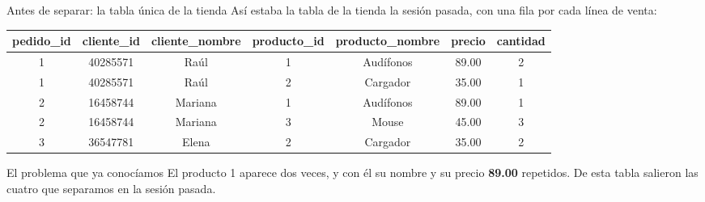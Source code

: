 \documentclass[aspectratio=169,10pt,c]{beamer}
\newenvironment{tablaventa}{\footnotesize\setlength\tabcolsep{4.5pt}}{}
\begin{document}
\begin{frame}{Antes de separar: la tabla única de la tienda}
\small Así estaba la tabla de la tienda la sesión pasada, con una fila por cada línea de venta:
\vspace{0.2cm}
\begin{center}
\begin{tablaventa}
\begin{tabular}{ccccccc}
\toprule
\bfseries pedido\_id & \bfseries cliente\_id & \bfseries cliente\_nombre & \bfseries producto\_id & \bfseries producto\_nombre & \bfseries precio & \bfseries cantidad \\
\midrule
1 & 40285571 & Raúl    & 1 & Audífonos & 89.00 & 2 \\
1 & 40285571 & Raúl    & 2 & Cargador  & 35.00 & 1 \\
2 & 16458744 & Mariana & 1 & Audífonos & 89.00 & 1 \\
2 & 16458744 & Mariana & 3 & Mouse     & 45.00 & 3 \\
3 & 36547781 & Elena   & 2 & Cargador  & 35.00 & 2 \\
\bottomrule
\end{tabular}
\end{tablaventa}
\end{center}
\vspace{0.35cm}
\begin{alertblock}{El problema que ya conocíamos}
\small El producto 1 aparece dos veces, y con él su nombre y su precio \textbf{89.00} repetidos. De esta tabla salieron las cuatro que separamos en la sesión pasada.
\end{alertblock}
\end{frame}
\end{document}
